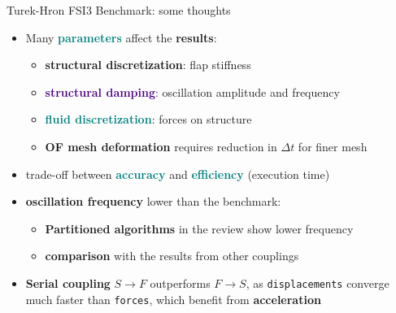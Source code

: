 \documentclass[10pt,t]{beamer}
\begin{document}
\begin{frame}{Turek-Hron FSI3 Benchmark: some thoughts}
    
    \begin{itemize}
        \item Many \textcolor{teal}{\textbf{parameters}} affect the \textbf{results}:
        
        \vspace{2mm}
        
        \begin{itemize}
            \item \textcolor{dorange}{\textbf{structural discretization}}: flap stiffness
            \item \textcolor{indigo}{\textbf{structural damping}}: oscillation amplitude and frequency
            \item \textcolor{teal}{\textbf{fluid discretization}}: forces on structure
            \item \textcolor{dblue}{\textbf{OF mesh deformation}} requires reduction in $\Delta t$ for finer mesh
        \end{itemize}
        
        \vspace{3mm}
        
        \pause
        
        \item trade-off between \textcolor{teal}{\textbf{accuracy}} and \textcolor{teal}{\textbf{efficiency}} (execution time)
        
        \vspace{3mm}
        
        \pause
        
        \item \textcolor{fgreen}{\textbf{oscillation frequency}} lower than the benchmark:
        
        \vspace{2mm}
        
        \begin{itemize}
            \item \textbf{Partitioned algorithms} in the review show lower frequency
            \item \textbf{comparison} with the results from other couplings
        \end{itemize}
        
        \vspace{3mm}
        
        \pause
        
        \item \textbf{Serial coupling} $S \to F$ outperforms $F \to S$, as \texttt{displacements} converge much faster than \texttt{forces}, which benefit from \textbf{acceleration}
        
    \end{itemize}
    
    
\end{frame}
\end{document}
